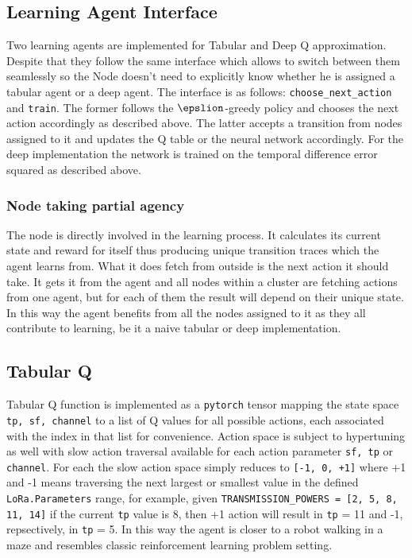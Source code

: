 \subsection{Learning Agent Interface}
Two learning agents are implemented for Tabular and Deep Q approximation. Despite that they follow the same interface
which allows to switch between them seamlessly so the Node
doesn't need to explicitly know whether he is assigned a 
tabular agent or a deep agent. The interface is as follows:
\texttt{choose\_next\_action} and \texttt{train}. The former 
follows the $\epslion$-greedy policy and chooses the next 
action accordingly as described above. The latter accepts
a transition from nodes assigned to it and updates the Q table
or the neural network accordingly. For the deep implementation
the network is trained on the temporal difference error squared
as described above. \\

\subsubsection{Node taking partial agency}

The node is directly involved in the learning process. 
It calculates its current state and reward for itself thus
producing  unique transition traces which the agent learns from. 
What it does fetch from outside is the next action it should
take. It gets it from the agent and all nodes within a cluster
are fetching actions from one agent, but for each of them
the result will depend on their unique state.\\

In this way the agent benefits from all the nodes assigned to 
it as they all contribute to learning, be it a naive tabular or
deep implementation.

\subsection{Tabular Q}
Tabular Q function is implemented as a \texttt{pytorch} 
tensor mapping the state space \texttt{tp, sf, channel} to 
a list of Q values for all possible actions, each associated
with the index in that list for convenience. Action space 
is subject to hypertuning as well with slow action traversal
available for each action parameter \texttt{sf, tp} or 
\texttt{channel}. For each the slow action space simply 
reduces to \texttt{[-1, 0, +1]} where +1 and -1 means traversing 
the next largest or smallest value in the defined \texttt{LoRa.Parameters} range, for example, given 
\texttt{TRANSMISSION\_POWERS = [2, 5, 8, 11, 14]} if the current 
\texttt{tp} value is 8, then +1 action will result in \texttt{tp} = 11 and -1, repsectively, in \texttt{tp} = 5. In this way 
the agent is closer to a robot walking in a maze and resembles classic reinforcement learning problem setting.

